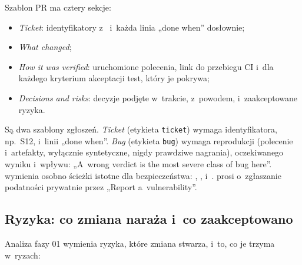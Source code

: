 Szablon PR ma cztery sekcje:
\begin{itemize}
  \item \emph{Ticket}: identyfikatory z~ i~każda linia „done when”
        dosłownie;
  \item \emph{What changed};
  \item \emph{How it was verified}: uruchomione polecenia, link do przebiegu CI i~dla
        każdego kryterium akceptacji test, który je pokrywa;
  \item \emph{Decisions and risks}: decyzje podjęte w~trakcie, z~powodem, i~zaakceptowane
        ryzyka.
\end{itemize}
Są dwa szablony zgłoszeń. \emph{Ticket} (etykieta \texttt{ticket}) wymaga identyfikatora,
np.~S12, i~linii „done when”. \emph{Bug} (etykieta \texttt{bug}) wymaga reprodukcji
(polecenie i~artefakty, wyłącznie syntetyczne, nigdy prawdziwe nagrania), oczekiwanego
wyniku i~wpływu: „A~wrong verdict is the most severe class of bug here”.
 wymienia osobno ścieżki istotne dla bezpieczeństwa:
, ,  i~.
 prosi o~zgłaszanie podatności prywatnie przez „Report a~vulnerability”.


\subsection{Ryzyka: co zmiana naraża i~co zaakceptowano}\label{sec:rdzen-ryzyka}

Analiza fazy 01 wymienia ryzyka, które zmiana stwarza, i~to, co je trzyma w~ryzach:

